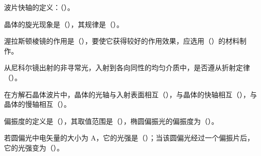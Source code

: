 \documentclass[padl, analysis, notocnum]{ExBook}
\newcommand{\answerarea}[1][3.5cm]{%
  \par\vspace{1mm}%
  \noindent{\color{themeColor!35}\rule{\linewidth}{0.4pt}}\par
  \noindent\begin{minipage}[t][#1][t]{\linewidth}\vspace{0pt}\end{minipage}\par
  \noindent{\color{themeColor!35}\rule{\linewidth}{0.4pt}}\par
}
\begin{document}
\begin{qitems}[startnum=3]
\qitem 波片快轴的定义：（\hspace{1.6em}）。
\label{q:317:start}
\answerarea[4.0cm]
\label{q:317:end}
\end{qitems}

\begin{qitems}[startnum=4]
\qitem 晶体的旋光现象是（\hspace{1.6em}），其规律是（\hspace{1.6em}）。
\label{q:318:start}
\answerarea[4.0cm]
\label{q:318:end}
\end{qitems}

\begin{qitems}[startnum=5]
\qitem 渥拉斯顿棱镜的作用是（\hspace{1.6em}），要使它获得较好的作用效果，应选用（\hspace{1.6em}）的材料制作。
\label{q:319:start}
\answerarea[4.0cm]
\label{q:319:end}
\end{qitems}

\begin{qitems}[startnum=6]
\qitem 从尼科尔镜出射的非寻常光，入射到各向同性的均匀介质中，是否遵从折射定律（\hspace{1.6em}）。
\label{q:320:start}
\answerarea[4.0cm]
\label{q:320:end}
\end{qitems}

\begin{qitems}[startnum=7]
\qitem 在方解石晶体波片中，晶体的光轴与入射表面相互（\hspace{1.6em}），与晶体的快轴相互（\hspace{1.6em}），与晶体的慢轴相互（\hspace{1.6em}）。
\label{q:321:start}
\answerarea[4.0cm]
\label{q:321:end}
\end{qitems}

\begin{qitems}[startnum=8]
\qitem 偏振度的定义是（\hspace{1.6em}），其取值范围是（\hspace{1.6em}），椭圆偏振光的偏振度为（\hspace{1.6em}）。
\label{q:322:start}
\answerarea[4.0cm]
\label{q:322:end}
\end{qitems}

\begin{qitems}[startnum=9]
\qitem 若圆偏光中电矢量的大小为 A，它的光强是（\hspace{1.6em}）；当该圆偏光经过一个偏振片后，它的光强变为（\hspace{1.6em}）。
\label{q:323:start}
\answerarea[4.0cm]
\label{q:323:end}
\end{qitems}
\end{document}
